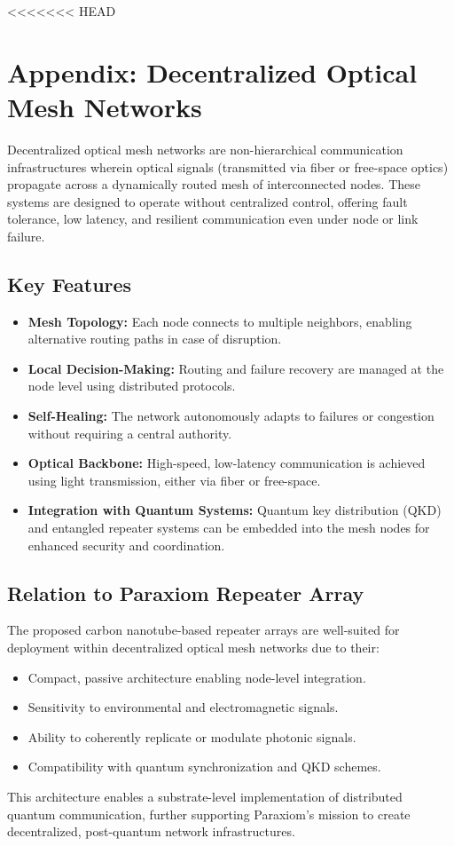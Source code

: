 \documentclass[11pt]{article}
\begin{document}
<<<<<<< HEAD
	\section*{Appendix: Decentralized Optical Mesh Networks}
	Decentralized optical mesh networks are non-hierarchical communication infrastructures wherein optical signals (transmitted via fiber or free-space optics) propagate across a dynamically routed mesh of interconnected nodes. These systems are designed to operate without centralized control, offering fault tolerance, low latency, and resilient communication even under node or link failure.
	
	\subsection*{Key Features}
	\begin{itemize}
		\item \textbf{Mesh Topology:} Each node connects to multiple neighbors, enabling alternative routing paths in case of disruption.
		\item \textbf{Local Decision-Making:} Routing and failure recovery are managed at the node level using distributed protocols.
		\item \textbf{Self-Healing:} The network autonomously adapts to failures or congestion without requiring a central authority.
		\item \textbf{Optical Backbone:} High-speed, low-latency communication is achieved using light transmission, either via fiber or free-space.
		\item \textbf{Integration with Quantum Systems:} Quantum key distribution (QKD) and entangled repeater systems can be embedded into the mesh nodes for enhanced security and coordination.
	\end{itemize}
	
	\subsection*{Relation to Paraxiom Repeater Array}
	The proposed carbon nanotube-based repeater arrays are well-suited for deployment within decentralized optical mesh networks due to their:
	\begin{itemize}
		\item Compact, passive architecture enabling node-level integration.
		\item Sensitivity to environmental and electromagnetic signals.
		\item Ability to coherently replicate or modulate photonic signals.
		\item Compatibility with quantum synchronization and QKD schemes.
	\end{itemize}
	
	This architecture enables a substrate-level implementation of distributed quantum communication, further supporting Paraxiom's mission to create decentralized, post-quantum network infrastructures.
	
\end{document}
